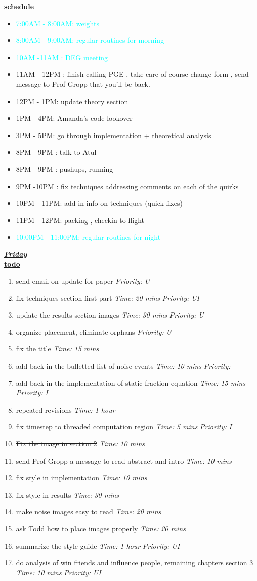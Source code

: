 \documentclass[11pt]{article}
\newcommand{\doneTask}[1]{\item \sout{#1}}
\newcommand{\timeEst}[1]{\textit{Time:} \textit{#1}}
\newcommand{\priority}[1]{\textit{Priority:} \textit{#1}}
\newcommand{\regItem}[1]{\item \textcolor{cyan}{#1}}
\begin{document}
\underline{\textbf{schedule}}\\
\begin{itemize}
\regItem{7:00AM - 8:00AM: weights}
\regItem{8:00AM - 9:00AM: regular routines for morning}
\regItem {10AM -11AM : DEG meeting}
\item 11AM - 12PM  : finish calling PGE , take care of course change form , send message to Prof Gropp that you'll be back.
\item 12PM - 1PM: update theory section
\item 1PM - 4PM: Amanda's code lookover
\item 3PM - 5PM: go through implementation + theoretical analysis
\item 8PM - 9PM : talk to Atul
\item 8PM - 9PM : pushups, running
\item 9PM -10PM :  fix techniques addressing comments on each of the quirks
\item 10PM - 11PM: add in info on techniques (quick fixes)
\item 11PM - 12PM: packing , checkin to flight
\regItem{10:00PM - 11:00PM: regular routines for night}
\end{itemize}

\underline{\textbf{\textit{Friday}}}\\
\underline{\textbf{todo}}\\
\begin{enumerate}
\item send email on update for paper \priority{U}
\item fix techniques section first part \timeEst{20 mins} \priority{UI}
\item update the results section images \timeEst{30 mins} \priority{U}
\item organize placement, eliminate orphans \priority{U}
\item fix the title \timeEst{15 mins}
\item add back in the bulletted list of noise events \timeEst{10 mins} \priority{}
\item add back in the implementation of static fraction equation \timeEst{15 mins}  \priority{I}
\item repeated revisions \timeEst{1 hour}
\item fix timestep to threaded computation region \timeEst{ 5 mins  }  \priority{I}
\doneTask{ Fix the image in section 2} \timeEst{ 10 mins}
\doneTask{send Prof Gropp a message to read abstract and intro} \timeEst{10 mins}

\item fix style in implementation \timeEst{10 mins}
\item fix style in results \timeEst{30 mins}
\item make noise images easy to read \timeEst{20 mins}
\item ask Todd how to place images properly \timeEst{20 mins}

\item summarize the style guide \timeEst{1 hour} \priority{UI}
\item do analysis of win friends and influence people, remaining chapters section 3 \timeEst{10 mins}  \priority{UI}
\end{enumerate}
\end{document}
